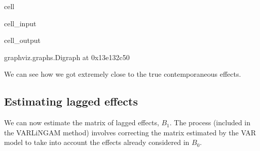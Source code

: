 \documentclass[letterpaper,10pt,english]{jupyterBook}
\begin{document}
\begin{sphinxuseclass}{cell}\begin{sphinxVerbatimInput}

\begin{sphinxuseclass}{cell_input}
\begin{sphinxVerbatim}[commandchars=\\\{\}]
  
 
\end{sphinxVerbatim}

\end{sphinxuseclass}\end{sphinxVerbatimInput}
\begin{sphinxVerbatimOutput}

\begin{sphinxuseclass}{cell_output}
\begin{sphinxVerbatim}[commandchars=\\\{\}]
\PYGZlt{}graphviz.graphs.Digraph at 0x13e132c50\PYGZgt{}
\end{sphinxVerbatim}

\end{sphinxuseclass}\end{sphinxVerbatimOutput}

\end{sphinxuseclass}
\sphinxAtStartPar
We can see how we got extremely close to the true contemporaneous effects.


\subsection{Estimating lagged effects}
\label{\detokenize{notebooks/semiparametric_varlingam:estimating-lagged-effects}}
\sphinxAtStartPar
We can now estimate the matrix of lagged effects, \(B_1\). The process (included in the VARLiNGAM method) involves correcting the matrix estimated by the VAR model to take into account the effects already considered in \(B_0\).
\end{document}
